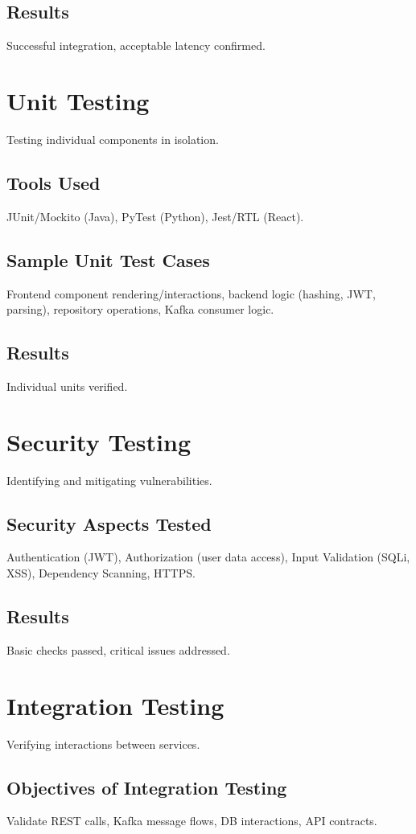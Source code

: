 \documentclass[12pt, a4paper]{report}
\begin{document}
\subsection{Results} Successful integration, acceptable latency confirmed.

\section{Unit Testing}
Testing individual components in isolation.
\subsection{Tools Used}
JUnit/Mockito (Java), PyTest (Python), Jest/RTL (React).
\subsection{Sample Unit Test Cases}
Frontend component rendering/interactions, backend logic (hashing, JWT, parsing), repository operations, Kafka consumer logic.
\subsection{Results} Individual units verified.

\section{Security Testing}
Identifying and mitigating vulnerabilities.
\subsection{Security Aspects Tested}
Authentication (JWT), Authorization (user data access), Input Validation (SQLi, XSS), Dependency Scanning, HTTPS.
\subsection{Results} Basic checks passed, critical issues addressed.

\section{Integration Testing}
Verifying interactions between services.
\subsection{Objectives of Integration Testing}
Validate REST calls, Kafka message flows, DB interactions, API contracts.
\end{document}
